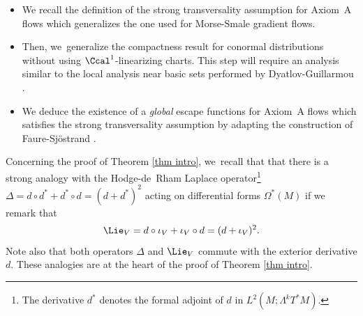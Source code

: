 \begin{itemize}
\item We recall the definition of the strong transversality assumption for Axiom~A flows which generalizes the one used for Morse-Smale gradient flows.
\item Then, we~generalize the compactness result for conormal distributions without using $\Ccal^1$-linearizing charts. This step will require an analysis similar to the local analysis near basic sets performed by Dyatlov-Guillarmou \cite{dyatlov-guillarmou_2016}.
\item We deduce the existence of a \emph{global} escape functions for Axiom~A flows which satisfies the strong transversality assumption by adapting the construction of Faure-Sjöstrand \cite{FS}.
\end{itemize}

Concerning the proof of Theorem \ref{thm intro}, we~recall that that there is a strong analogy with the Hodge-de~Rham Laplace operator\footnote{The derivative $d^*$ denotes the formal adjoint of $d$ in $L^2 (M; \Lambda^k T^* M)$.} $\Delta = d \circ d^* + d^* \circ d = (d + d^*)^2$ acting on differential forms $\Omega^* (M)$ if we remark that
\[
\Lie_V = d\circ \iota_V + \iota_V \circ d = (d + \iota_V)^2.
\]
Note also that both operators $\Delta$ and $\Lie_V$ commute with the exterior derivative $d$. These analogies are at the heart of the proof of Theorem \ref{thm intro}.


